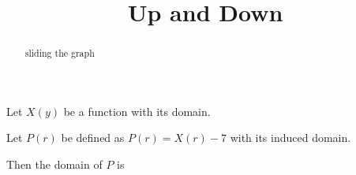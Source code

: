 \documentclass{ximera}
\title{Up and Down}
\begin{document}
\begin{abstract}
sliding the graph
\end{abstract}
\maketitle











Let $X(y)$ be a function with its domain.

Let $P(r)$ be defined as $P(r) = X(r)-7$ with its induced domain.


\begin{question}  


Then the domain of $P$ is

\begin{multipleChoice}
\end{multipleChoice}

\end{question}
\end{document}
